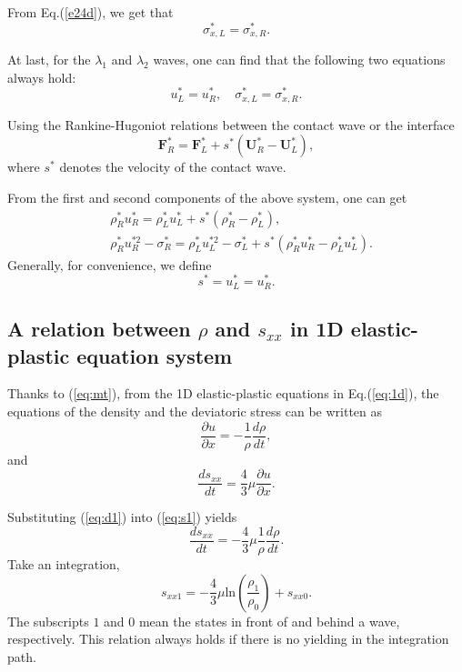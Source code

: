\documentclass{article}
\numberwithin{equation}{section}
\numberwithin{table}{section}
\begin{document}
From  Eq.(\ref{e24d}), we  get that
\begin{equation}   \label{e27a}
\sigma_{x,L} ^{\ast}=  \sigma_{x,R} ^{\ast}.
\end{equation}


At last, for the $\lambda_{1}$ and $\lambda_{2}$ waves, one can find
that the following two equations always hold:
\begin{equation}   \label{e28}
u_{L}^{\ast}=u_{R}^{\ast}, \quad
\sigma_{x,L}^{\ast}=\sigma_{x,R}^{\ast}.
\end{equation}

Using  the Rankine-Hugoniot relations between the contact wave  or  the interface
\begin{equation}
	\bm{F}_R^* = \bm{F}_L^*+s^*(\bm{U}_R^*-\bm{U}_L^*),
\end{equation}
where $s^*$ denotes the velocity of the contact wave.

From the first and second components of the above system, one can get
\begin{align}
  & \rho_R^* u_R^*=\rho_L^* u_L^*+s^*(\rho_R^*-\rho_L^*),\\
  & \rho_R^* u_R^{*2}-\sigma^*_R=\rho_L^* u_L^{*2}-\sigma_L^*+s^*(\rho_R^* u_R^*-\rho_L^* u_L^*).
\end{align}
Generally, for convenience, we define
\begin{equation}\label{eq:contact}
  s^* = u_L^* = u_R^*. %
\end{equation}

\subsection{A relation between $\rho$ and $s_{xx}$ in 1D elastic-plastic  equation system}

Thanks to (\ref{eq:mt}), from the 1D elastic-plastic  equations in Eq.(\ref{eq:1d}), the equations of the density and the deviatoric stress can be written as
  \begin{equation}\label{eq:d1}
	\frac{\partial u}{\partial x} = -\frac{1}{\rho}\frac{d\rho}{dt},
  \end{equation}
  and
  \begin{equation}\label{eq:s1}
	\frac{ds_{xx}}{dt}=\frac{4}{3}\mu\frac{\partial u}{\partial x}.
  \end{equation}

  Substituting (\ref{eq:d1}) into (\ref{eq:s1}) yields
  \begin{equation}
	\frac{ds_{xx}}{dt}=-\frac{4}{3}\mu \frac{1}{\rho}\frac{d\rho}{dt}.
\end{equation}
Take an integration,
\begin{equation}\label{eq:rhosxx}
  s_{xx1}=-\frac{4}{3}\mu\text{ln}(\frac{\rho_{1}}{\rho_{0}})+s_{xx0}.
\end{equation}
The subscripts $1$ and $0$ mean the states in front of and behind a wave, respectively.
This relation always holds if there is no yielding in the integration path.
\end{document}
